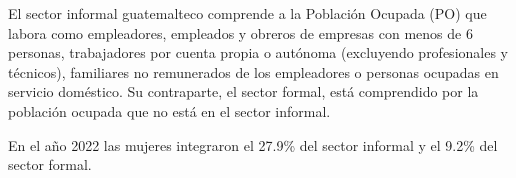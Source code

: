 El sector informal guatemalteco comprende a la Población Ocupada (PO) que labora como empleadores, empleados y obreros de empresas con menos de 6 personas, trabajadores por cuenta propia o autónoma (excluyendo profesionales y técnicos), familiares no remunerados de los empleadores o personas ocupadas en servicio doméstico. Su contraparte, el sector formal, está comprendido por la población ocupada que no está en el sector informal. 

En el año 2022 las mujeres integraron el 27.9\% del sector informal y el 9.2\% del sector formal. 